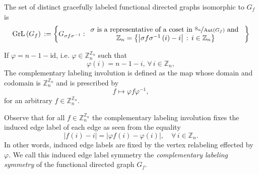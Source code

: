 \begin{definition}\label{defn:graceful-functional-graphs-set}
The set of distinct gracefully labeled functional directed graphs isomorphic to $G_{f}$ is 
\[
\text{GrL}\left(G_{f}\right)\,:=\left\{ G_{\sigma f\sigma^{-1}}:\begin{array}{c}
\sigma\text{ is a representative of a coset in }\nicefrac{\text{S}_{n}}{\text{Aut}\left(G_{f}\right)}\text{ and }\\
\mathbb{Z}_{n}=\left\{ \left|\sigma f\sigma^{-1}\left(i\right)-i\right|\,:\,i\in\mathbb{Z}_{n}\right\} 
\end{array}\right\} 
\]
\end{definition}
\begin{definition}\label{defn:complementary-labeling-symmetry}
If $\varphi=n-1-\text{id}$, i.e. $\varphi \in \mathbb{Z}_{n}^{\mathbb{Z}_{n}}$ such that
\[
\varphi(i)=n-1-i,\, \forall \,i\in \mathbb{Z}_{n},
\]
The complementary labeling involution is defined as the map whose domain and codomain is $\mathbb{Z}_{n}^{\mathbb{Z}_{n}}$ and is prescribed by
\[
f \mapsto \varphi f \varphi^{-1},
\]
for an arbitrary $f\in\mathbb{Z}_{n}^{\mathbb{Z}_{n}}$.
\end{definition}
Observe that for all $f\in \mathbb{Z}_{n}^{\mathbb{Z}_{n}}$ the complementary labeling involution fixes the induced edge label of each edge as seen from the equality
\begin{equation}
\left|f(i)-i\right|=\left|\varphi f(i)-\varphi(i)\right|,\quad\forall\,i\in\mathbb{Z}_{n}.
\end{equation}
In other words, induced edge labels are fixed by the vertex relabeling effected by $\varphi$. We call this induced edge label symmetry the \emph{complementary labeling symmetry} of the functional directed graph $G_f$.

